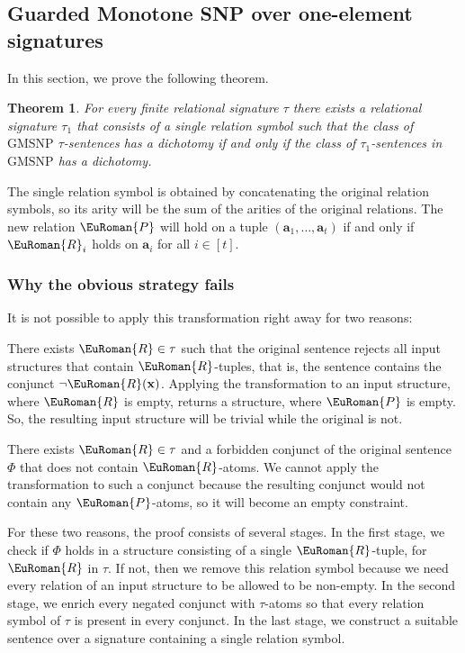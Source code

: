 \documentclass[10pt,a4paper]{amsart}
\theoremstyle{plain}
\newtheorem{thm}{Theorem}[section]
\theoremstyle{definition}
\numberwithin{equation}{section}
\newcommand{\eurm}[1]{\EuRoman{#1}} %
\newcommand{\tuple}[1]{\mathbf{#1}} %
\newcommand{\rel}[1]{\eurm{#1}} %
\newcommand{\GMSNP}[0]{\textrm{GMSNP}}
\begin{document}
\subsection{Guarded Monotone SNP over one-element signatures}\label{section:gmsnp}

In this section, we prove the following theorem.

\begin{thm}\label{th:gmsnp} 
For every finite relational signature $\tau$ there exists a relational signature $\tau_1$ that consists of a single relation symbol such that the class of $\GMSNP$ $\tau$-sentences has a dichotomy if and only if the class of $\tau_1$-sentences in $\GMSNP$ has a dichotomy.
\end{thm} 



The single relation symbol is obtained by concatenating the original relation symbols, so its arity will be the sum of the arities of the original relations.
The new relation $\rel{P}$ will hold on a tuple $(\tuple{a}_1,\ldots,\tuple{a}_t)$ if and only if $\rel{R}_i$ holds on $\tuple{a}_i$ for all $i\in[t]$.
\subsubsection*{Why the obvious strategy fails}
It is not possible to apply this transformation right away for two reasons:
\begin{compactenum}[(a)]
\item There exists $\rel{R}\in\tau$ such that the original sentence rejects all input structures that contain $\rel{R}$-tuples, that is, the sentence contains the conjunct $\neg\rel{R}(\tuple{x})$.
Applying the transformation to an input structure, where $\rel{R}$ is empty, returns a structure, where $\rel{P}$ is empty.
So, the resulting input structure will be trivial while the original is not.
\item There exists $\rel{R}\in\tau$ and a forbidden conjunct of the original sentence $\Phi$ that does not contain $\rel{R}$-atoms. 
We cannot apply the transformation to such a conjunct because the resulting conjunct would not contain any $\rel{P}$-atoms, so it will become an empty constraint.
\end{compactenum}
For these two reasons, the proof consists of several stages.
In the first stage, we check if $\Phi$ holds in a structure consisting of a
single $\rel{R}$-tuple, for $\rel{R}$ in $\tau$. If not, then we remove this relation symbol because we need every relation of an input structure to be allowed to be non-empty.
In the second stage, we enrich every negated conjunct with $\tau$-atoms so that every relation symbol of $\tau$ is present in every conjunct.
In the last stage, we construct a suitable sentence over a signature containing a single relation symbol.
\end{document}
